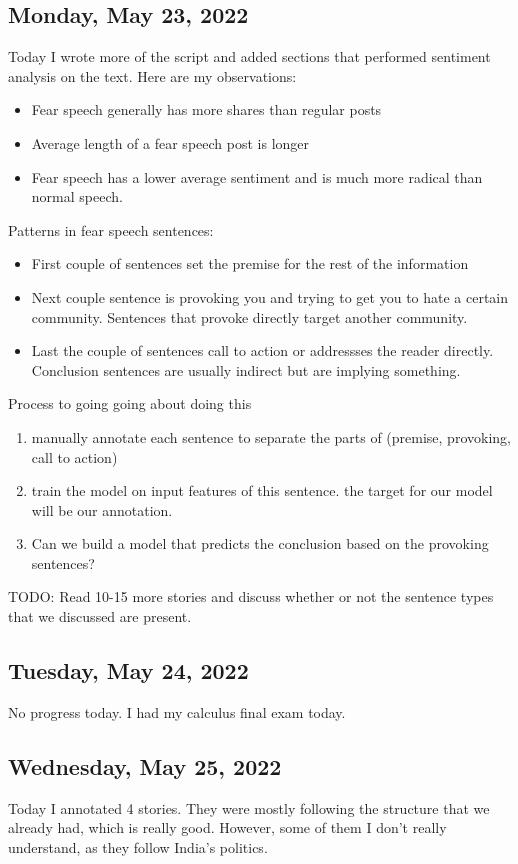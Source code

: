 \documentclass[11pt,letterpaper]{article}
\begin{document}
\subsection{Monday, May 23, 2022}
Today I wrote more of the script and added sections that performed sentiment analysis on the text. Here are my observations:
\begin{itemize}
    \item Fear speech generally has more shares than regular posts
    \item Average length of a fear speech post is longer
    \item Fear speech has a lower average sentiment and is much more radical than normal speech.
\end{itemize}

Patterns in fear speech sentences:
\begin{itemize}
    \item First couple of sentences set the premise for the rest of the information
    \item Next couple sentence is provoking you and trying to get you to hate a certain community. Sentences that provoke directly target another community.
    \item Last the couple of sentences call to action or addressses the reader directly. Conclusion sentences are usually indirect but are implying something.
\end{itemize}

Process to going going about doing this
\begin{enumerate}
    \item manually annotate each sentence to separate the parts of (premise, provoking, call to action)
    \item train the model on input features of this sentence. the target for our model will be our annotation.
    \item Can we build a model that predicts the conclusion based on the provoking sentences?
\end{enumerate}

TODO: Read 10-15 more stories and discuss whether or not the sentence types that we discussed are present.

\subsection{Tuesday, May 24, 2022}
No progress today. I had my calculus final exam today.

\subsection{Wednesday, May 25, 2022}
Today I annotated 4 stories. They were mostly following the structure that we already had, which is really good. However, some of them I don't really understand, as they follow India's politics.
\end{document}
